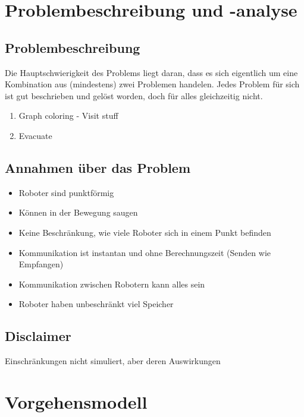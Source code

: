 \documentclass{article}
\begin{document}

\section{Problembeschreibung und -analyse}

\subsection{Problembeschreibung}

Die Hauptschwierigkeit des Problems liegt daran, dass es sich eigentlich
um eine Kombination aus (mindestens) zwei Problemen handelen. Jedes Problem
für sich ist gut beschrieben und gelöst worden, doch für alles gleichzeitig
nicht.

\begin{enumerate}
\item Graph coloring - Visit stuff
\item Evacuate 
\end{enumerate}

\subsection{Annahmen über das Problem}

\begin{itemize}
\item Roboter sind punktförmig
\item Können in der Bewegung saugen
\item Keine Beschränkung, wie viele Roboter sich in einem Punkt befinden
\item Kommunikation ist instantan und ohne Berechnungszeit (Senden wie Empfangen)
\item Kommunikation zwischen Robotern kann alles sein
\item Roboter haben unbeschränkt viel Speicher
\end{itemize}

\subsection{Disclaimer}

Einschränkungen nicht simuliert, aber deren Auswirkungen

\clearpage
\section{Vorgehensmodell}
\end{document}
